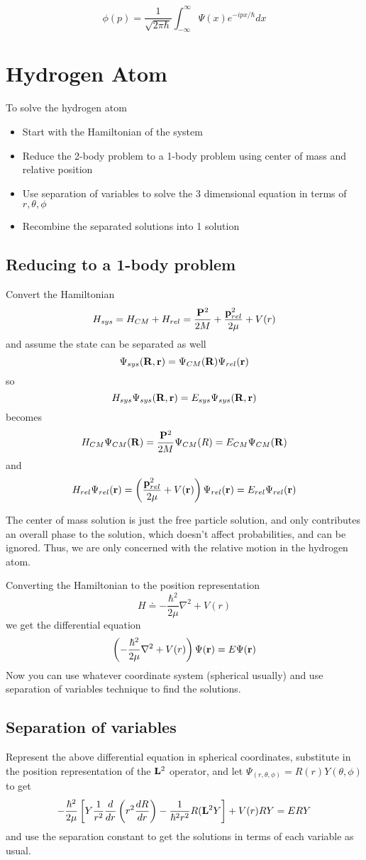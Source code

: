 \documentclass{article}
\begin{document}
$$
\phi(p) = \frac{1}{\sqrt{2\pi\hbar}} \int_{-\infty}^{\infty} \Psi(x) e^{-i p x / \hbar} dx
$$

\section{Hydrogen Atom}
To solve the hydrogen atom
\begin{itemize}
    \item Start with the Hamiltonian of the system
    \item Reduce the 2-body problem to a 1-body problem using center of mass and relative position
    \item Use separation of variables to solve the 3 dimensional equation in terms of $r,\theta,\phi$
    \item Recombine the separated solutions into 1 solution
\end{itemize}

\subsection{Reducing to a 1-body problem}
Convert the Hamiltonian
$$
H_{sys} = H_{CM} + H_{rel} = \frac{\vb{P}^2}{2M} + \frac{\vb{p}_{rel}^{2}}{2\mu} + V(r)
$$ 
and assume the state can be separated as well 
$$
\Psi_{sys}(\vb{R},\vb{r}) = \Psi_{CM}(\vb{R}) \Psi_{rel}(\vb{r})
$$
so 
$$
H_{sys}\Psi_{sys}(\vb{R},\vb{r}) = E_{sys}\Psi_{sys}(\vb{R}, \vb{r})
$$
becomes
$$
H_{CM}\Psi_{CM}(\vb{R}) = \frac{\vb{P}^2}{2M} \Psi_{CM}(R) = E_{CM} \Psi_{CM}(\vb{R})
$$
and 
$$
H_{rel}\Psi_{rel}(\vb{r}) = \left( \frac{\vb{p}_{rel}^2}{2\mu} + V(\vb{r}) \right) \Psi_{rel}(\vb{r}) = E_{rel}\Psi_{rel}(\vb{r})
$$

The center of mass solution is just the free particle solution, and only contributes an overall phase to the solution, which doesn't affect probabilities, and can be ignored.  Thus, we are only concerned with the relative motion in the hydrogen atom.

Converting the Hamiltonian to the position representation
$$
H \doteq - \frac{\hbar^2}{2\mu} \nabla^2 + V(r)
$$
we get the differential equation
$$
\left( -\frac{\hbar^2}{2\mu} \nabla^2 + V(r) \right) \Psi(\vb{r}) = E \Psi(\vb{r})
$$
Now you can use whatever coordinate system (spherical usually) and use separation of variables technique to find the solutions.

\subsection{Separation of variables}
Represent the above differential equation in spherical coordinates, substitute in the position representation of the $\vb{L}^2$ operator, and let $\Psi_(r,\theta,\phi) = R(r) Y(\theta,\phi)$
to get 
$$
-\frac{\hbar^2}{2\mu} \left[ Y\frac{1}{r^2} \frac{d}{dr}\left(r^2\frac{dR}{dr} \right) - \frac{1}{\hbar^2 r^2} R(\vb{L}^2Y \right] + V(r)RY = ERY
$$
and use the separation constant to get the solutions in terms of each variable as usual.
\end{document}
